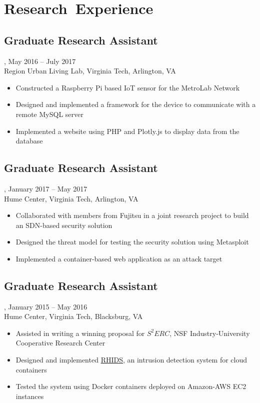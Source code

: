 \section{Research~Experience}
\subsection{Graduate Research Assistant}, May 2016 -- July 2017\\
Region Urban Living Lab, Virginia Tech, Arlington, VA
\begin{itemize}
\item Constructed a Raspberry Pi based IoT sensor for the MetroLab Network
\item Designed and implemented a framework for the device to communicate with a remote MySQL server
\item Implemented a website using PHP and Plotly.js to display data from the database
\end{itemize}
\subsection{Graduate Research Assistant}, January 2017 -- May 2017\\
Hume Center,
Virginia Tech, Arlington, VA
\begin{itemize}
\item Collaborated with members from Fujitsu in a joint research project to build an SDN-based security solution
\item Designed the threat model for testing the security solution using Metasploit
\item Implemented a container-based web application as an attack target
\end{itemize}
\subsection{Graduate Research Assistant}, January 2015 -- May 2016\\
Hume Center, Virginia Tech, Blacksburg, VA
\begin{itemize}
\item Assisted in writing a winning proposal for \href{https://www.serc.net}{$S^2ERC$}, NSF Industry-University Cooperative Research Center
\item Designed and implemented \href{https://github.com/amrabed/rhids}{RHIDS}, an intrusion detection system for cloud containers
\item Tested the system using Docker containers deployed on Amazon-AWS EC2 instances
\end{itemize}


